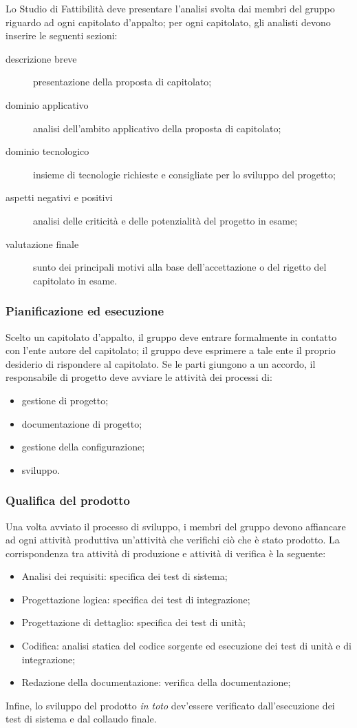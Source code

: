 Lo Studio di Fattibilità deve presentare l'analisi svolta dai membri del gruppo riguardo ad ogni capitolato d'appalto; per ogni capitolato, gli analisti devono inserire le seguenti sezioni:
\begin{description}
	\item[descrizione breve] presentazione della proposta di capitolato; 
	\item[dominio applicativo] analisi dell'ambito applicativo della proposta di capitolato; 
	\item[dominio tecnologico] insieme di tecnologie richieste e consigliate per lo sviluppo del progetto;
	\item[aspetti negativi e positivi] analisi delle criticità e delle potenzialità del progetto in esame;
	\item[valutazione finale] sunto dei principali motivi alla base dell'accettazione o del rigetto del capitolato in esame.
\end{description}

\subsubsection{Pianificazione ed esecuzione}
Scelto un capitolato d'appalto, il gruppo deve entrare formalmente in contatto con l'ente autore del capitolato; il gruppo deve esprimere a tale ente il proprio desiderio di rispondere al capitolato. Se le parti giungono a un accordo, il responsabile di progetto deve avviare le attività dei processi di:
\begin{itemize}
	\item gestione di progetto;
	\item documentazione di progetto;
	\item gestione della configurazione;
	\item sviluppo.
\end{itemize}

\subsubsection{Qualifica del prodotto}
Una volta avviato il processo di sviluppo, i membri del gruppo devono affiancare ad ogni attività produttiva un'attività che verifichi ciò che è stato prodotto. La corrispondenza tra attività di produzione e attività di verifica è la seguente:
\begin{itemize}
	\item Analisi dei requisiti: specifica dei test di sistema;
	\item Progettazione logica: specifica dei test di integrazione;
	\item Progettazione di dettaglio: specifica dei test di unità;
	\item Codifica: analisi statica del codice sorgente ed esecuzione dei test di unità e di integrazione;
	\item Redazione della documentazione: verifica della documentazione;
\end{itemize}
Infine, lo sviluppo del prodotto \emph{in toto} dev'essere verificato dall'esecuzione dei test di sistema e dal collaudo finale.

